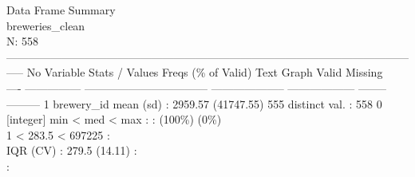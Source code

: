 \documentclass[]{article}
\newenvironment{Shaded}{\begin{snugshade}}{\end{snugshade}}
\newcommand{\KeywordTok}[1]{\textcolor[rgb]{0.13,0.29,0.53}{\textbf{#1}}}
\newcommand{\DataTypeTok}[1]{\textcolor[rgb]{0.13,0.29,0.53}{#1}}
\newcommand{\StringTok}[1]{\textcolor[rgb]{0.31,0.60,0.02}{#1}}
\newcommand{\CommentTok}[1]{\textcolor[rgb]{0.56,0.35,0.01}{\textit{#1}}}
\newcommand{\OperatorTok}[1]{\textcolor[rgb]{0.81,0.36,0.00}{\textbf{#1}}}
\newcommand{\NormalTok}[1]{#1}
\begin{document}
\begin{Shaded}
\end{Shaded}

Data Frame Summary\\
breweries\_clean\\
N: 558\\
-----------------------------------------------------------------------------------------------------------------
No Variable Stats / Values Freqs (\% of Valid) Text Graph Valid
Missing\\
---- --------------- ---------------------------------
-------------------- ------------------ -------- --------- 1 brewery\_id
mean (sd) : 2959.57 (41747.55) 555 distinct val. : 558 0\\
{[}integer{]} min \textless{} med \textless{} max : : (100\%) (0\%)\\
1 \textless{} 283.5 \textless{} 697225 :\\
IQR (CV) : 279.5 (14.11) :\\
:
\end{document}
